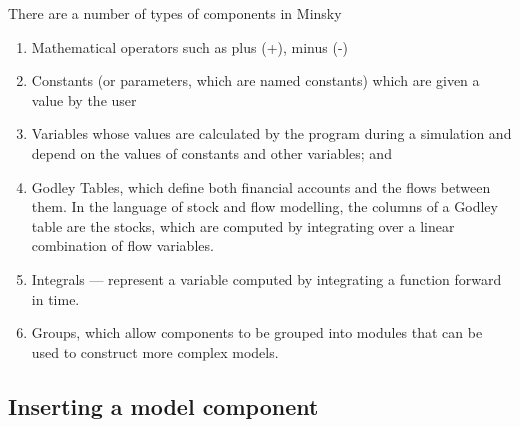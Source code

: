 There are a number of types of components in Minsky 
\begin{enumerate}
\item Mathematical operators such as plus (+), minus (-) 
\item Constants (or parameters, which are named constants) which are given
a value by the user 
\item Variables whose values are calculated by the program during a simulation
and depend on the values of constants and other variables; and 
\item Godley Tables, which define both financial accounts and the flows
between them. In the language of stock and flow modelling, the columns
of a Godley table are the stocks, which are computed by integrating
over a linear combination of flow variables. 
\item Integrals --- represent a variable computed by integrating a function
forward in time. 
\item Groups, which allow components to be grouped into modules that can
be used to construct more complex models. 
\end{enumerate}

\subsection{Inserting a model component}

